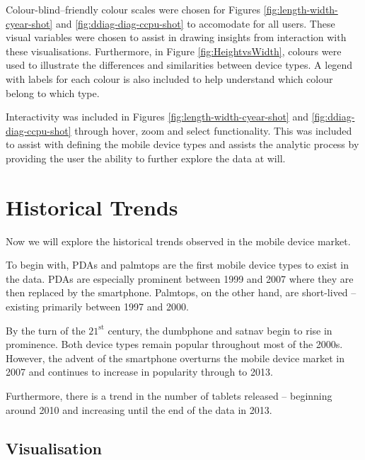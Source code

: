 \documentclass[conference]{IEEEtran}
\begin{document}
Colour-blind--friendly colour scales were chosen for Figures
\ref{fig:length-width-cyear-shot} and \ref{fig:ddiag-diag-ccpu-shot} to
accomodate for all users. These visual variables were chosen to assist in
drawing insights from interaction with these visualisations. Furthermore,
in Figure \ref{fig:HeightvsWidth}, colours were used to illustrate the
differences and similarities between device types. A legend with labels for
each colour is also included to help understand which colour belong to which
type.

Interactivity was included in Figures \ref{fig:length-width-cyear-shot} and
\ref{fig:ddiag-diag-ccpu-shot} through hover, zoom and select
functionality. This was included to assist with defining the mobile device
types and assists the analytic process by providing the user the ability to
further explore the data at will.

\section{Historical Trends}

Now we will explore the historical trends observed in the mobile device market.

To begin with, PDAs and palmtops are the first mobile device types to exist in
the data. PDAs are especially prominent between
1999 and 2007 where they are then replaced by the smartphone. Palmtops, on the
other hand, are short-lived -- existing primarily between 1997 and 2000.

By the turn of the $21^{\text{st}}$ century, the dumbphone and satnav begin
to rise in prominence. Both device types remain popular throughout most of the
2000s. However, the advent of the smartphone overturns the mobile device market
in 2007 and continues to increase in popularity through to 2013.

Furthermore, there is a trend in the number of tablets released -- beginning
around 2010 and increasing until the end of the data in 2013.


\subsection{Visualisation}
\end{document}
